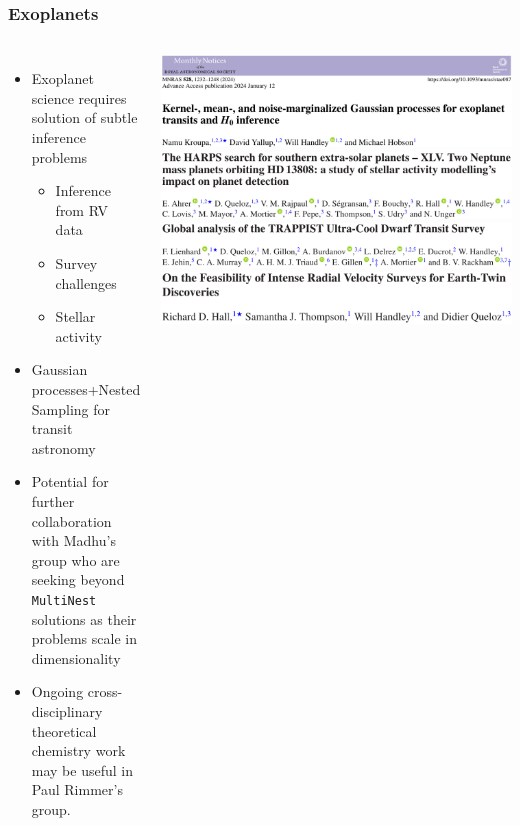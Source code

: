 \documentclass[aspectratio=169, handout]{beamer}
\begin{document}
\begin{frame}
    \frametitle{Exoplanets}

    \begin{columns}
        \begin{itemize}
            \item Exoplanet science requires solution of subtle inference problems
                \begin{itemize}
                    \item Inference from RV data~
                    \item Survey challenges~
                    \item Stellar activity~ 
                \end{itemize}
            \item Gaussian processes+Nested Sampling for transit astronomy~
            \item Potential for further collaboration with Madhu's group who are seeking beyond \texttt{MultiNest} solutions as their problems scale in dimensionality
            \item Ongoing cross-disciplinary theoretical chemistry work may be useful in Paul Rimmer's group.
        \end{itemize}

        \includegraphics[width=\textwidth]{figures/exoplanet_kernel.pdf}%
        \vspace{10pt}
        \includegraphics[width=\textwidth]{figures/harps_headline.pdf}%
        \vspace{10pt}
        \includegraphics[width=\textwidth]{figures/trappist_headline.pdf}%
        \vspace{10pt}
        \includegraphics[width=\textwidth]{figures/rv_headline.pdf}%
    \end{columns}
\end{frame}
\end{document}
